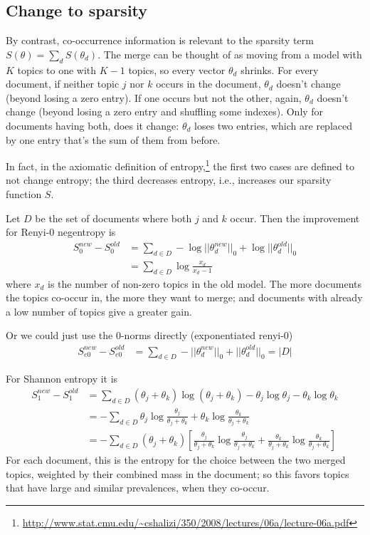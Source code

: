 \documentclass[11pt,letterpaper]{article}
\theoremstyle{definition}
\begin{document}
\subsection{Change to sparsity}

By contrast, co-occurrence information is relevant to the sparsity term $S(\theta)=\sum_d S(\theta_d)$.  The merge can be thought of as moving from a model with $K$ topics to one with $K-1$ topics, so every vector $\theta_d$ shrinks.  For every document, if neither topic $j$ nor $k$ occurs in the document, $\theta_d$ doesn't change (beyond losing a zero entry).  If one occurs but not the other, again, $\theta_d$ doesn't change (beyond losing a zero entry and shuffling some indexes).  Only for documents having both, does it change: $\theta_d$ loses two entries, which are replaced by one entry that's the sum of them from before.

In fact, in the axiomatic definition of entropy,\footnote{\url{http://www.stat.cmu.edu/~cshalizi/350/2008/lectures/06a/lecture-06a.pdf}} the first two cases are defined to not change entropy; the third decreases entropy, i.e., increases our sparsity function $S$.

Let $D$ be the set of documents where both $j$ and $k$ occur.  Then the improvement for Renyi-0 negentropy is
  \begin{align}
  S^{new}_0-S^{old}_0
  &= \sum_{d\in D} -\log ||\theta^{new}_d||_0 + \log ||\theta^{old}_d||_0
  \\
  &= \sum_{d\in D} \log \frac{x_d}{x_d-1}
  \end{align}
where $x_d$ is the number of non-zero topics in the old model.  The more documents the topics co-occur in, the more they want to merge; and documents with already a low number of topics give a greater gain.

Or we could just use the 0-norms directly (exponentiated renyi-0)
  \begin{align}
  S^{new}_{e0}-S^{old}_{e0}
  &= \sum_{d\in D} -||\theta^{new}_d||_0 + ||\theta^{old}_d||_0
  = |D|
  \end{align}

For Shannon entropy it is
  \begin{align}
  S^{new}_1-S^{old}_1
  &= \sum_{d \in D} (\theta_j+\theta_k) \log(\theta_j+\theta_k)
      -\theta_j\log\theta_j-\theta_k\log\theta_k
      \\
  &= -\sum_{d \in D}
        \theta_j \log \frac{\theta_j}{\theta_j+\theta_k}
        +
        \theta_k \log \frac{\theta_k}{\theta_j+\theta_k}
      \\
  &= -\sum_{d \in D} (\theta_j+\theta_k)
      \left[
      \frac{\theta_j}{\theta_j+\theta_k}\log\frac{\theta_j}{\theta_j+\theta_k}
      +
      \frac{\theta_k}{\theta_j+\theta_k}\log\frac{\theta_k}{\theta_j+\theta_k}
      \right]
  \end{align}
For each document, this is the entropy for the choice between the two merged topics, weighted by their combined mass in the document; so this favors topics that have large and similar prevalences, when they co-occur.
\end{document}
